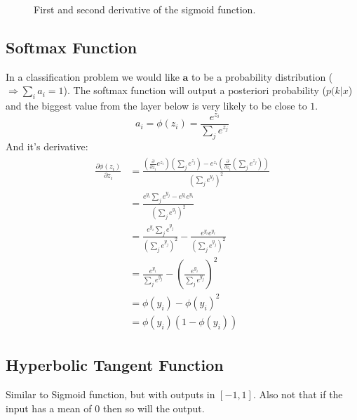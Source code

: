 \begin{figure}
\centering
{}
\caption{First and second derivative of the sigmoid function.}
\end{figure}

\subsection{Softmax Function}
In a classification problem we would like $\mathbf{a}$ to be a probability distribution ($\Rightarrow \sum_i a_i = 1$). The softmax function will output a posteriori probability ($p(k|x$) and the biggest value from the layer below is very likely to be close to $1$.
\begin{equation}\label{ed:softmax}
a_i = \phi(z_i) = \frac{e^{z_i}}{\sum_j e^{z_j}}
\end{equation}
And it's derivative:
\begin{align}
\begin{split}\label{ed:softmax_derivative}
\frac{\partial \phi(z_i)}{\partial z_i}
&= \frac{\left(\frac{\partial}{\partial z_i} e^{z_i}\right)(\sum_j e^{z_j}) - e^{z_i} \left(\frac{\partial}{\partial z_i}(\sum_j e^{z_j})\right)}{(\sum_j e^{y_j})^2}\\
&= \frac{e^{y_i} \sum_j e^{y_j} - e^{y_i} e^{y_i}}{(\sum_j e^{y_j})^2}\\
&= \frac{e^{y_i} \sum_j e^{y_j}}{(\sum_j e^{y_j})^2} - \frac{e^{y_i} e^{y_i}}{(\sum_j e^{y_j})^2}\\
&= \frac{e^{y_i}}{\sum_j e^{y_j}} - \left(\frac{e^{y_i}}{\sum_j e^{y_j}}\right)^2\\
&= \phi(y_i) - \phi(y_i)^2\\
&= \phi(y_i) (1 - \phi(y_i))
\end{split}
\end{align}

\subsection{Hyperbolic Tangent Function}
Similar to Sigmoid function, but with outputs in $[-1,1]$. Also not that if the input has a mean of $0$ then so will the output.

